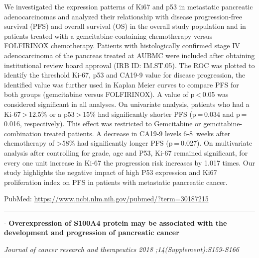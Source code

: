 \documentclass[]{article}
\begin{document}
We investigated the expression patterns of Ki67 and p53 in metastatic
pancreatic adenocarcinomas and analyzed their relationship with disease
progression-free survival (PFS) and overall survival (OS) in the overall
study population and in patients treated with a gemcitabine-containing
chemotherapy versus FOLFIRINOX chemotherapy. Patients with
histologically confirmed stage IV adenocarcinoma of the pancreas treated
at AUBMC were included after obtaining institutional review board
approval (IRB ID: IM.ST.05). The ROC was plotted to identify the
threshold Ki-67, p53 and CA19-9 value for disease progression, the
identified value was further used in Kaplan Meier curves to compare PFS
for both groups (gemcitabine versus FOLFIRINOX). A value of
p \textless{} 0.05 was considered significant in all analyses. On
univariate analysis, patients who had a Ki-67 \textgreater{} 12.5\% or a
p53 \textgreater{} 15\% had significantly shorter PFS (p = 0.034 and
p = 0.016, respectively). This effect was restricted to Gemcitabine or
gemcitabine-combination treated patients. A decrease in CA19-9 levels
6-8~weeks after chemotherapy of \textgreater{}58\% had significantly
longer PFS (p = 0.027). On multivariate analysis after controlling for
grade, age and P53, Ki-67 remained significant, for every one unit
increase in Ki-67 the progression risk increases by 1.017 times. Our
study highlights the negative impact of high P53 expression and Ki67
proliferation index on PFS in patients with metastatic pancreatic
cancer.

PubMed: \url{https://www.ncbi.nlm.nih.gov/pubmed/?term=30187215}

{}

{}

\begin{center}\rule{0.5\linewidth}{\linethickness}\end{center}

 - \textbf{Overexpression of S100A4 protein may be associated with the
development and progression of pancreatic cancer}

\emph{Journal of cancer research and therapeutics 2018
;14(Supplement):S159-S166}
\end{document}
